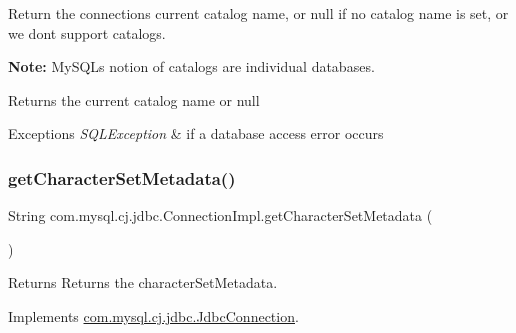 Return the connections current catalog name, or null if no catalog name is set, or we dont support catalogs. 

{\bfseries Note\+:} My\+S\+QL\textquotesingle{}s notion of catalogs are individual databases. 

\begin{DoxyReturn}{Returns}
the current catalog name or null 
\end{DoxyReturn}

\begin{DoxyExceptions}{Exceptions}
{\em S\+Q\+L\+Exception} & if a database access error occurs \\
\hline
\end{DoxyExceptions}
\mbox{\label{classcom_1_1mysql_1_1cj_1_1jdbc_1_1_connection_impl_ac1333e56c524a3b5436c575ee82b0c18}} 
\subsubsection{\texorpdfstring{get\+Character\+Set\+Metadata()}{getCharacterSetMetadata()}}
{\footnotesize\ttfamily String com.\+mysql.\+cj.\+jdbc.\+Connection\+Impl.\+get\+Character\+Set\+Metadata (\begin{DoxyParamCaption}{ }\end{DoxyParamCaption})}

\begin{DoxyReturn}{Returns}
Returns the character\+Set\+Metadata. 
\end{DoxyReturn}


Implements \mbox{\hyperlink{interfacecom_1_1mysql_1_1cj_1_1jdbc_1_1_jdbc_connection}{com.\+mysql.\+cj.\+jdbc.\+Jdbc\+Connection}}.

\mbox{\label{classcom_1_1mysql_1_1cj_1_1jdbc_1_1_connection_impl_a628961d1155b35d0582a3198c2a6bb83}} 
